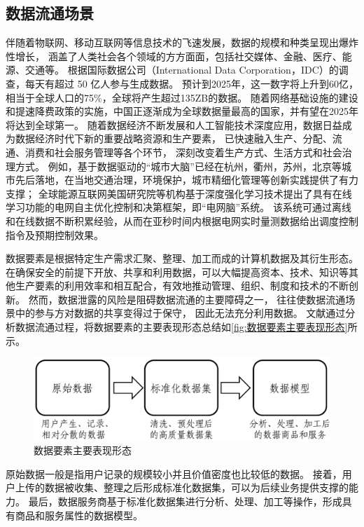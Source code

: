 \subsection{数据流通场景}
伴随着物联网、移动互联网等信息技术的飞速发展，数据的规模和种类呈现出爆炸性增长，
涵盖了人类社会各个领域的方方面面，包括社交媒体、金融、医疗、能源、交通等。
根据国际数据公司（International Data Corporation，IDC）的调查，每天有超过 50 亿人参与生成数据。
预计到2025年，这一数字将上升到60亿，相当于全球人口的75\%，全球将产生超过135ZB的数据。
随着网络基础设施的建设和提速降费政策的实施，中国正逐渐成为全球数据量最高的国家，并有望在2025年将达到全球第一\cite{IDC2018-1}。
随着数据经济不断发展和人工智能技术深度应用，数据日益成为数据经济时代下新的重要战略资源和生产要素，
已快速融入生产、分配、流通、消费和社会服务管理等各个环节，
深刻改变着生产方式、生活方式和社会治理方式\cite{庄子银2022充分发挥数据新型生产要素作用}。
例如，基于数据驱动的“城市大脑”已经在杭州，衢州，苏州，北京等城市先后落地，在当地交通治理，环境保护，城市精细化管理等创新实践提供了有力支撑\cite{叶晓楠2019}；
全球能源互联网美国研究院等机构基于深度强化学习技术提出了具有在线学习功能的电网自主优化控制和决第框架，即“电网脑”系统。
该系统可通过离线和在线数据不断积累经验，从而在亚秒时间内根据电网实时量测数据给出调度控制指令及预期控制效果\cite{王之伟2020基于深度强化学习的电网自主控制与决策技术}。

数据要素是根据特定生产需求汇聚、整理、加工而成的计算机数据及其衍生形态\cite{信通院2023数据要素白皮书}。
在确保安全的前提下开放、共享和利用数据，可以大幅提高资本、技术、知识等其他生产要素的利用效率和相互配合，有效地推动管理、组织、制度和技术的不断创新。
然而，数据泄露的风险是阻碍数据流通的主要障碍之一，
往往使数据流通场景中的参与方对数据的共享变得过于保守，
因此无法充分利用数据\cite{陈晓建2019大数据安全流通机制的研究与应用}。
文献{\rm\parencite{信通院2023数据要素白皮书}}通过分析数据流通过程，将数据要素的主要表现形态总结如\autoref{fig:数据要素主要表现形态}所示。
\begin{figure}[h]
    \centering
    \includegraphics[width=0.75\hsize]{figure/others/数据要素主要表现形态.pdf}
    \caption{数据要素主要表现形态} 
    \label{fig:数据要素主要表现形态}
\end{figure}
原始数据一般是指用户记录的规模较小并且价值密度也比较低的数据。
接着，用户上传的数据被收集、整理之后形成标准化数据集，可以为后续业务提供支撑的能力。
最后，数据服务商基于标准化数据集进行分析、处理、加工等操作，形成具有商品和服务属性的数据模型。

